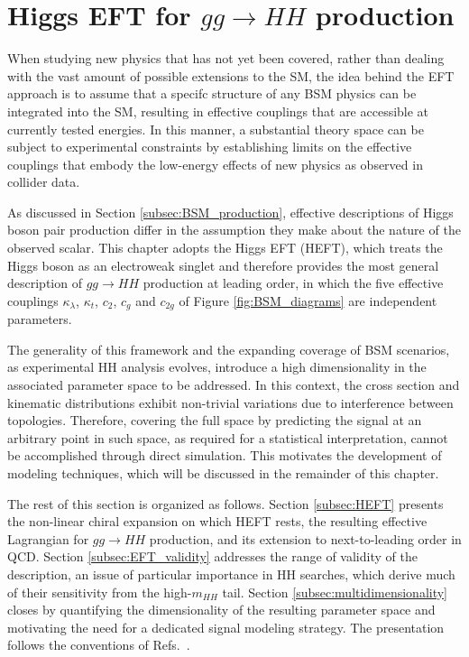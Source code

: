 \section{Higgs EFT for \texorpdfstring{$gg\to HH$}{gg → HH} production}
\label{subsec:EFTs}
When studying new physics that has not yet been covered, rather than dealing with the vast amount of possible extensions to the SM, the idea behind the EFT approach is to assume that a specifc structure of any BSM physics can be integrated into the SM, resulting in effective couplings that are accessible at currently tested energies. In this manner, a substantial theory space can be subject to experimental constraints by establishing limits on the effective couplings that embody the low-energy effects of new physics as observed in collider data.

As discussed in Section \ref{subsec:BSM_production}, effective descriptions of Higgs boson pair production differ in the assumption they make about the nature of the observed scalar. This chapter adopts the Higgs EFT (HEFT), which treats the Higgs boson as an electroweak singlet and therefore provides the most general description of $gg\to HH$ production at leading order, in which the five effective couplings $\kappa_{\lambda}$, $\kappa_t$, $c_2$, $c_g$ and $c_{2g}$ of Figure \ref{fig:BSM_diagrams} are independent parameters.


The generality of this framework and the expanding coverage of BSM scenarios, as experimental HH analysis evolves, introduce a high dimensionality in the associated parameter space to be addressed. In this context, the cross section and kinematic distributions exhibit non-trivial variations due to interference between topologies. Therefore, covering the full space by predicting the signal at an arbitrary point in such space, as required for a statistical interpretation, cannot be accomplished through direct simulation. This motivates the development of modeling techniques, which will be discussed in the remainder of this chapter.

The rest of this section is organized as follows. Section \ref{subsec:HEFT} presents the non-linear chiral expansion on which HEFT rests, the resulting effective Lagrangian for $gg\to HH$ production, and its extension to next-to-leading order in QCD. Section \ref{subsec:EFT_validity} addresses the range of validity of the description, an issue of particular importance in HH searches, which derive much of their sensitivity from the high-$m_{HH}$ tail. Section \ref{subsec:multidimensionality} closes by quantifying the dimensionality of the resulting parameter space and motivating the need for a dedicated signal modeling strategy. The presentation follows the conventions of Refs.~\cite{Alasfar:2023xpc,Buchalla:2018yce}.


